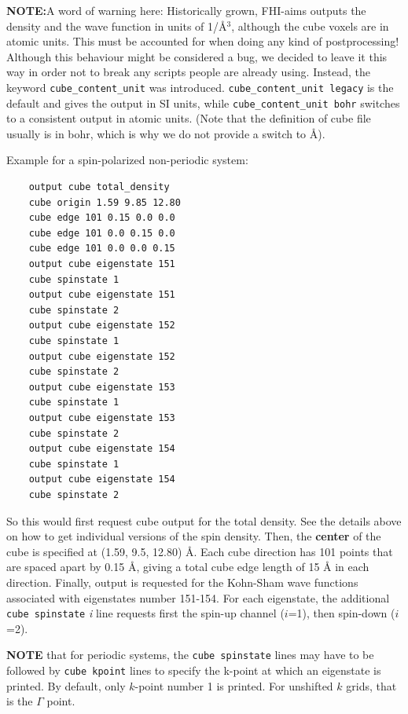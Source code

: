 \textbf{NOTE:}A word of warning here: Historically grown, FHI-aims outputs the density and the wave function
in units of 1/\AA$^3$, although the cube voxels are in atomic units. This must be accounted for
when doing any kind of postprocessing! Although this behaviour might be considered a bug, we
decided to leave it this way in order not to break any scripts people are already using. 
Instead, the keyword \texttt{cube\_content\_unit} was introduced. \newline
\texttt{cube\_content\_unit legacy} is the default and gives the output in SI units, while \newline
\texttt{cube\_content\_unit bohr} switches to a consistent output in atomic units. 
(Note that the definition of cube file usually is in bohr, which is why we do not provide 
a switch to \AA).

Example for a spin-polarized non-periodic system: 
\begin{verbatim}
    output cube total_density
    cube origin 1.59 9.85 12.80
    cube edge 101 0.15 0.0 0.0
    cube edge 101 0.0 0.15 0.0
    cube edge 101 0.0 0.0 0.15
    output cube eigenstate 151
    cube spinstate 1
    output cube eigenstate 151
    cube spinstate 2
    output cube eigenstate 152
    cube spinstate 1
    output cube eigenstate 152
    cube spinstate 2
    output cube eigenstate 153
    cube spinstate 1
    output cube eigenstate 153
    cube spinstate 2
    output cube eigenstate 154
    cube spinstate 1
    output cube eigenstate 154
    cube spinstate 2
\end{verbatim}
So this would first request cube output for the total density. See the
details above on how to get individual versions of the spin
density. Then, the \textbf{center} of the cube is specified at (1.59,
9.5, 12.80) {\AA}. Each cube direction has 101 points that are spaced
apart by 0.15 {\AA}, giving a total cube edge length of 15 {\AA} in
each direction. Finally, output is requested for the Kohn-Sham wave
functions associated with eigenstates number 151-154. For each
eigenstate, the additional \texttt{cube spinstate} \emph{i} line requests
first the spin-up channel ($i$=1), then spin-down ($i$=2). 

\textbf{NOTE} that for periodic systems, the \texttt{cube spinstate} lines
may have to be followed by \texttt{cube kpoint} lines to specify the k-point
at which an eigenstate is printed. By default, only $k$-point number 1 is printed. 
For unshifted $k$ grids, that is the $\Gamma$ point.


